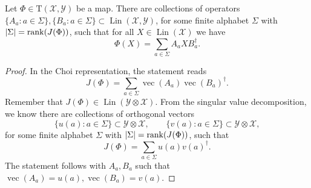 \documentclass[12pt]{report}
\newcommand{\on}[1]{\operatorname{#1}}
\newcommand{\calY}{{\mathcal{Y}}}
\newcommand{\calX}{{\mathcal{X}}}
\newcommand{\rmT}{{\mathrm{T}}}
\DeclareMathOperator{\Lin}{Lin}
\begin{document}
\begin{prop}
	Let $\Phi\in\rmT(\calX,\calY)$ be a map. There are collections of operators $\{A_a: a\in\Sigma\},\{B_a: a\in\Sigma\}\subset\Lin(\calX,\calY)$, for some finite alphabet $\Sigma$ with $\lvert\Sigma\rvert=\rank(J(\Phi))$, such that for all $X\in\Lin(\calX)$ we have
	\begin{equation}
		\Phi(X) = \sum_{a\in\Sigma} A_a X B_a^\dagger.
	\end{equation}
\end{prop}
\begin{proof}
	In the Choi representation, the statement reads
	\begin{equation}
		J(\Phi) = \sum_{a\in\Sigma} \on{vec}(A_a) \on{vec}(B_a)^\dagger.
	\end{equation}
	Remember that $J(\Phi)\in\Lin(\calY\otimes\calX)$.
	From the singular value decomposition, we know there are collections of orthogonal vectors
	\begin{equation}
		\{u(a):a\in\Sigma\}\subset \calY\otimes\calX, \qquad
		\{v(a):a\in\Sigma\}\subset \calY\otimes\calX,
	\end{equation}
	for some finite alphabet $\Sigma$ with $\lvert\Sigma\rvert=\rank(J(\Phi))$, such that
	\begin{equation}
		J(\Phi) = \sum_{a\in\Sigma} u(a) v(a)^\dagger.
	\end{equation}
	The statement follows with $A_a,B_a$ such that $\on{vec}(A_a)=u(a), \on{vec}(B_a)=v(a)$.
\end{proof}
\end{document}
